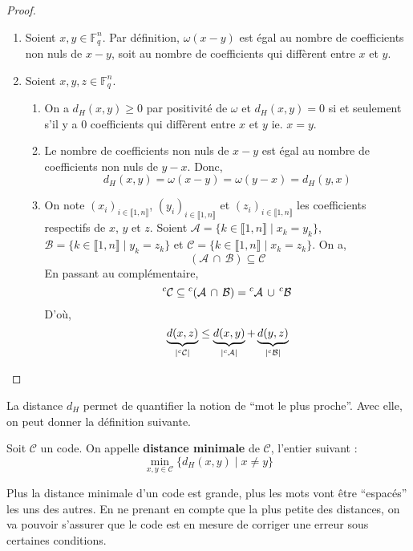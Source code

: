   \begin{proof}
    \begin{enumerate}[label=(\roman*)]
      \item Soient $x, y \in \mathbb{F}_q^n$. Par définition, $\omega(x-y)$ est égal au nombre de coefficients non nuls de $x-y$, soit au nombre de coefficients qui diffèrent entre $x$ et $y$.
      \item Soient $x, y, z \in \mathbb{F}_q^n$.
      \begin{enumerate}
        \item On a $d_H(x,y) \geq 0$ par positivité de $\omega$ et $d_H(x,y) = 0$ si et seulement s'il y a $0$ coefficients qui diffèrent entre $x$ et $y$ ie. $x = y$.
        \item Le nombre de coefficients non nuls de $x-y$ est égal au nombre de coefficients non nuls de $y-x$. Donc,
        \[ d_H(x,y) = \omega(x-y) = \omega(y-x) = d_H(y,x) \]
        \item On note $(x_i)_{i \in \llbracket 1, n \rrbracket}$, $(y_i)_{i \in \llbracket 1, n \rrbracket}$ et $(z_i)_{i \in \llbracket 1, n \rrbracket}$ les coefficients respectifs de $x$, $y$ et $z$. Soient $\mathcal{A} = \{ k \in \llbracket 1, n \rrbracket \mid x_k = y_k \}$, $\mathcal{B} = \{ k \in \llbracket 1, n \rrbracket \mid y_k = z_k \}$ et $\mathcal{C} = \{ k \in \llbracket 1, n \rrbracket \mid x_k = z_k \}$. On a,
        \[ (\mathcal{A} \, \cap \, \mathcal{B}) \subseteq \mathcal{C} \]
        En passant au complémentaire,
        \[ \mathstrut ^c\mathcal{C} \subseteq \mathstrut ^c(\mathcal{A} \, \cap \, \mathcal{B}) = \mathstrut ^c \mathcal{A} \, \cup \, \mathstrut ^c \mathcal{B} \]
        D'où,
        \[ \underbrace{d(x,z)}_{|\mathstrut ^c\mathcal{C}|} \leq \underbrace{d(x,y)}_{|\mathstrut ^c\mathcal{A}|} + \underbrace{d(y,z)}_{|\mathstrut ^c\mathcal{B}|} \]
      \end{enumerate}
    \end{enumerate}
  \end{proof}

  La distance $d_H$ permet de quantifier la notion de ``mot le plus proche''. Avec elle, on peut donner la définition suivante.

  \begin{definition}
    Soit $\mathcal{C}$ un code. On appelle \textbf{distance minimale} de $\mathcal{C}$, l'entier suivant :
    \[ \min_{x,y \in \mathcal{C}} \{ d_H(x,y) \mid x \neq y \} \]
  \end{definition}

  Plus la distance minimale d'un code est grande, plus les mots vont être ``espacés'' les uns des autres. En ne prenant en compte que la plus petite des distances, on va pouvoir s'assurer que le code est en mesure de corriger une erreur sous certaines conditions.

